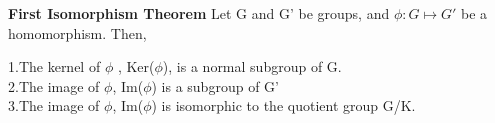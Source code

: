 %
\begin{theorem}
\textbf{First Isomorphism Theorem}
\label{thm:first_isomorphism_thm}
\cite{rosen_symmetry_1995,armstrong_groups_1988}
Let G and G' be groups, and $\phi : G \mapsto G'$ be a homomorphism. Then,

1.The kernel of $\phi$ , Ker($\phi$), is a normal subgroup of G.\\

2.The image of $\phi$, Im($\phi$) is a subgroup of G'\\ 

3.The image of $\phi$,  Im($\phi$) is isomorphic to the quotient group G/K.
\end{theorem}
%
%
